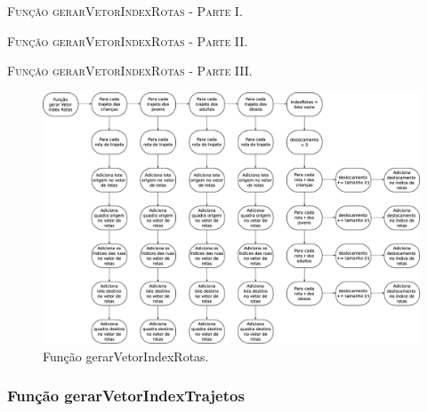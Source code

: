 

\begin{algorithm}[H]
   \SetAlgoLined   
   
   \caption{\textsc{Função gerarVetorIndexRotas - Parte I.}}
   \label{alg:gerarVetorIndexRotas1}
\end{algorithm}

\newpage

\begin{algorithm}[H]
   \SetAlgoLined   
   
   \caption{\textsc{Função gerarVetorIndexRotas - Parte II.}}
   \label{alg:gerarVetorIndexRotas2}
\end{algorithm}

\newpage

\begin{algorithm}[H]
   \SetAlgoLined   
   
   \caption{\textsc{Função gerarVetorIndexRotas - Parte III.}}
   \label{alg:gerarVetorIndexRotas3}
\end{algorithm}

\begin{figure}[H]
  \centering
  \includegraphics[width=1\textwidth]{Figuras/Simula/Fluxos/gerarVetorIndexRotas.eps}
  \caption{Função gerarVetorIndexRotas.}
  \label{fig:gerarVetorIndexRotas}
\end{figure} 

\newpage

\subsubsection{Função gerarVetorIndexTrajetos}

